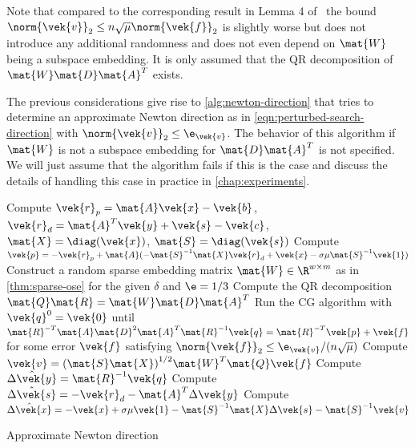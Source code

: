 Note that compared to the corresponding result in Lemma 4 of~\cite{Avron-FasterRandomizedInfeasibleIPMs} the bound \(\norm{\vek{v}}_2 \leq n \sqrt{\mu} \norm{\vek{f}}_2\) is slightly worse but does not introduce any additional randomness and does not even depend on \(\mat{W}\) being a subspace embedding.
It is only assumed that the QR decomposition of \(\mat{W}\mat{D}\mat{A}^T\) exists.

The previous considerations give rise to \cref{alg:newton-direction} that tries to determine an approximate Newton direction as in \cref{eqn:perturbed-search-direction} with \(\norm{\vek{v}}_2 \leq \e_{\vek{v}}\).
The behavior of this algorithm if \(\mat{W}\) is not a subspace embedding for \(\mat{D}\mat{A}^T\) is not specified.
We will just assume that the algorithm fails if this is the case and discuss the details of handling this case in practice in \cref{chap:experiments}.

\begin{algorithm}
  Compute \(\vek{r}_p = \mat{A}\vek{x} - \vek{b}\), \(\vek{r}_d = \mat{A}^T \vek{y} + \vek{s} - \vek{c}\), \(\mat{X} = \diag(\vek{x})\), \(\mat{S} = \diag(\vek{s})\)\;
  Compute \(\vek{p} = -\vek{r}_p + \mat{A}(-\mat{S}^{-1}\mat{X}\vek{r}_d + \vek{x} - \sigma \mu \mat{S}^{-1} \vek{1})\)\;
  Construct a random sparse embedding matrix \(\mat{W} \in \R^{w \times m}\) as in \cref{thm:sparse-ose} for the given \(\delta\) and \(\e = 1/3\)\;
  Compute the QR decomposition \(\mat{Q} \mat{R} = \mat{W} \mat{D} \mat{A}^T\)\;
  Run the CG algorithm with \(\vek{q}^0 = \vek{0}\) until \(\mat{R}^{-T} \mat{A} \mat{D}^2 \mat{A}^T \mat{R}^{-1} \vek{q} = \mat{R}^{-T} \vek{p} + \vek{f}\) for some error \(\vek{f}\) satisfying \(\norm{\vek{f}}_2 \leq \e_{\vek{v}}/(n \sqrt{\mu})\)\;\label{line:cg}
  Compute \(\vek{v} = {(\mat{S} \mat{X})}^{1/2} \mat{W}^T \mat{Q} \vek{f}\)\;\label{line:compute-v}
  Compute \(\hat{\Delta\vek{y}} = \mat{R}^{-1}\vek{q}\)\;
  Compute \(\hat{\Delta\vek{s}} = -\vek{r}_d - \mat{A}^T \Delta\vek{y}\)\;
  Compute \(\hat{\Delta\vek{x}} = -\vek{x} + \sigma \mu \vek{1} - \mat{S}^{-1}\mat{X} \Delta\vek{s} - \mat{S}^{-1} \vek{v}\)\;\label{line:compute-delta-x}
  \;
  \caption{Approximate Newton direction}\label{alg:newton-direction}
\end{algorithm}

